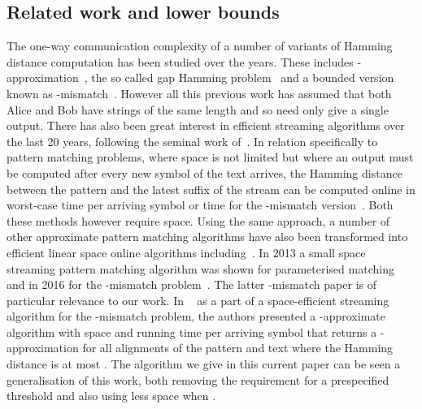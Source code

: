 \subsection{Related work and lower bounds}
The one-way communication complexity of a number of variants of Hamming distance computation has been studied over the years. These includes -approximation~\cite{JW:2013}, the so called gap Hamming problem~\cite{CR:2012} and a bounded version known as -mismatch~\cite{HSZZ:06}. However all this previous work has assumed that both Alice and Bob have strings of the same length and so need only give a single output. There has also been great interest in efficient streaming algorithms over the last 20 years, following the seminal work of~\cite{AMS:1996}. In relation specifically to pattern matching problems,  where space is not limited but where an output must be computed after every new symbol of the text arrives, the Hamming distance between the pattern and the latest suffix of the stream can be computed online in  worst-case time per arriving symbol or  time for the -mismatch version~\cite{CS:2010}.  Both these methods however require  space.  Using the same approach, a number of other approximate pattern matching algorithms have also been transformed into efficient linear space online algorithms including~\cite{AAKLP:2008,AABLLPSV:2009,AALP:2006,AFM:1994, AEE:2006,ACHP:2003,LV:1988kdiff}. In 2013 a small space streaming pattern matching algorithm was shown for parameterised matching~\cite{JPS:2013} and in 2016 for the -mismatch problem~\cite{CFPSS:2016}. The latter -mismatch paper is of particular relevance to our work. In ~\cite{CFPSS:2016} as a part of a space-efficient streaming algorithm for the -mismatch problem, the authors presented a -approximate algorithm with space  and running time  per arriving symbol that returns a -approximation for all alignments of the pattern and text where the Hamming distance is at most . The algorithm we give in this current paper can be seen a generalisation of this work, both removing the requirement for a prespecified threshold  and also using less space when .
 
 
